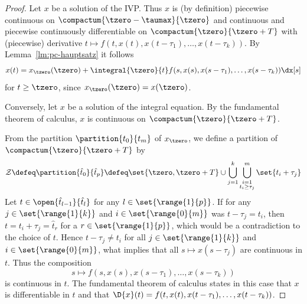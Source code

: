     \begin{proof}
        Let $x$ be a solution of the IVP. Thus $x$ is (by definition) piecewise continuous on $\compactum{\tzero-\taumax}{\tzero}$ and continuous and piecewise continuously differentiable on $\compactum{\tzero}{\tzero+T}$ with (piecewise) derivative $t\mapsto f(t,x(t),x(t-\tau_1),\ldots,x(t-\tau_k))$.
        By Lemma~\ref{lm:pc-hauptsatz} it follows
        \begin{equation*}
            x(t) = x_{\tzero}(\tzero) + \integral{\tzero}{t} f(s,x(s),x(s-\tau_1),\ldots,x(s-\tau_k))\dx[s]
        \end{equation*}
        for $t\geq\tzero$, since $x_{\tzero}(\tzero)=x(\tzero)$.

        Conversely, let $x$ be a solution of the integral equation.
        By the fundamental theorem of calculus, $x$ is continuous on $\compactum{\tzero}{\tzero+T}$.

        From the partition $\partition{t_0}{t_m}$ of $x_{\tzero}$, we define a partition of $\compactum{\tzero}{\tzero+T}$ by
        \begin{equation}\label{eq:partition}
            \mathcal{Z}\defeq \partition{\hat{t}_0}{\hat{t}_p}
            \defeq \set{\tzero,\tzero+T}\cup\bigcup_{j=1}^{k}\bigcup_{\substack{i=1\\t_i\geq\tau_j}}^{m}\set{t_i+\tau_j}
        \end{equation}
        Let $t\in\open{\hat{t}_{l-1}}{\hat{t}_l}$ for any $l\in\set{\range{1}{p}}$. If for any $j\in\set{\range{1}{k}}$ and $i\in\set{\range{0}{m}}$ was $t-\tau_j = t_i$, then $t=t_i+\tau_j=\hat{t}_r$ for a $r\in\set{\range{1}{p}}$, which would be a contradiction to the choice of $t$. Hence $t-\tau_j \neq t_i$ for all $j\in\set{\range{1}{k}}$ and $i\in\set{\range{0}{m}}$, what implies that all $s\mapsto x(s-\tau_j)$ are continuous in $t$. Thus the composition
        \begin{equation*}
            s\mapsto f(s,x(s),x(s-\tau_1),\ldots,x(s-\tau_k))
        \end{equation*}
        is continuous in $t$. The fundamental theorem of calculus states in this case that $x$ is differentiable in $t$ and that $\D{x}(t)=f(t,x(t),x(t-\tau_1),\ldots,x(t-\tau_k))$.


\end{proof}

